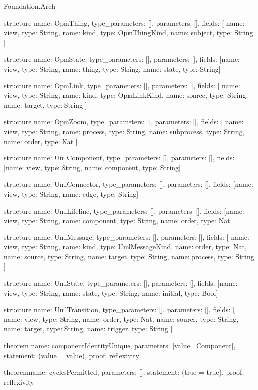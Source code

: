 \begin{lexlean}{Foundation.Arch}
\begin{semanticmodule}
structure{
  name: OpmThing,
  type_parameters: [],
  parameters: [],
  fields: [
    {name: view, type: String},
    {name: kind, type: OpmThingKind},
    {name: subject, type: String}
  ]
}

structure{
  name: OpmState,
  type_parameters: [],
  parameters: [],
  fields: [{name: view, type: String}, {name: thing, type: String}, {name: state, type: String}]
}

structure{
  name: OpmLink,
  type_parameters: [],
  parameters: [],
  fields: [
    {name: view, type: String},
    {name: kind, type: OpmLinkKind},
    {name: source, type: String},
    {name: target, type: String}
  ]
}

structure{
  name: OpmZoom,
  type_parameters: [],
  parameters: [],
  fields: [
    {name: view, type: String},
    {name: process, type: String},
    {name: subprocess, type: String},
    {name: order, type: Nat}
  ]
}

structure{
  name: UmlComponent,
  type_parameters: [],
  parameters: [],
  fields: [{name: view, type: String}, {name: component, type: String}]
}

structure{
  name: UmlConnector,
  type_parameters: [],
  parameters: [],
  fields: [{name: view, type: String}, {name: edge, type: String}]
}

structure{
  name: UmlLifeline,
  type_parameters: [],
  parameters: [],
  fields: [{name: view, type: String}, {name: component, type: String}, {name: order, type: Nat}]
}

structure{
  name: UmlMessage,
  type_parameters: [],
  parameters: [],
  fields: [
    {name: view, type: String},
    {name: kind, type: UmlMessageKind},
    {name: order, type: Nat},
    {name: source, type: String},
    {name: target, type: String},
    {name: process, type: String}
  ]
}

structure{
  name: UmlState,
  type_parameters: [],
  parameters: [],
  fields: [{name: view, type: String}, {name: state, type: String}, {name: initial, type: Bool}]
}

structure{
  name: UmlTransition,
  type_parameters: [],
  parameters: [],
  fields: [
    {name: view, type: String},
    {name: order, type: Nat},
    {name: source, type: String},
    {name: target, type: String},
    {name: trigger, type: String}
  ]
}

theorem{
  name: componentIdentityUnique,
  parameters: [value : Component],
  statement: (value = value),
  proof: reflexivity{}
}

theorem{name: cyclesPermitted, parameters: [], statement: (true = true), proof: reflexivity{}}
\end{semanticmodule}
\end{lexlean}
